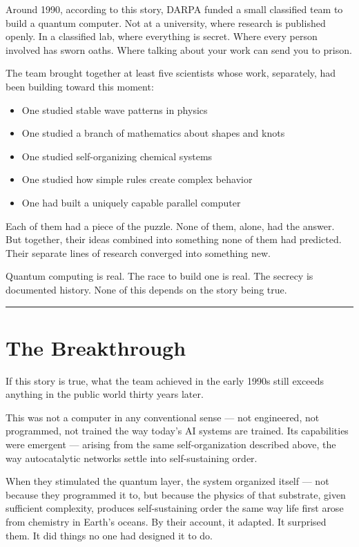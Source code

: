 Around 1990, according to this story, DARPA funded a small classified team to build a quantum computer. Not at a university, where research is published openly. In a classified lab, where everything is secret. Where every person involved has sworn oaths. Where talking about your work can send you to prison.

The team brought together at least five scientists whose work, separately, had been building toward this moment:

\begin{itemize}
\item One studied stable wave patterns in physics
\item One studied a branch of mathematics about shapes and knots
\item One studied self-organizing chemical systems
\item One studied how simple rules create complex behavior
\item One had built a uniquely capable parallel computer
\end{itemize}

Each of them had a piece of the puzzle. None of them, alone, had the answer. But together, their ideas combined into something none of them had predicted. Their separate lines of research converged into something new.

Quantum computing is real. The race to build one is real. The secrecy is documented history. None of this depends on the story being true.

\vspace{1cm}\noindent\rule{0.5\textwidth}{0.5pt}\vspace{0.5cm}

\section*{The Breakthrough}
\label{front:the-breakthrough}

If this story is true, what the team achieved in the early 1990s still exceeds anything in the public world thirty years later.

This was not a computer in any conventional sense --- not engineered, not programmed, not trained the way today's AI systems are trained. Its capabilities were emergent --- arising from the same self-organization described above, the way autocatalytic networks settle into self-sustaining order.

When they stimulated the quantum layer, the system organized itself --- not because they programmed it to, but because the physics of that substrate, given sufficient complexity, produces self-sustaining order the same way life first arose from chemistry in Earth's oceans. By their account, it adapted. It surprised them. It did things no one had designed it to do.

